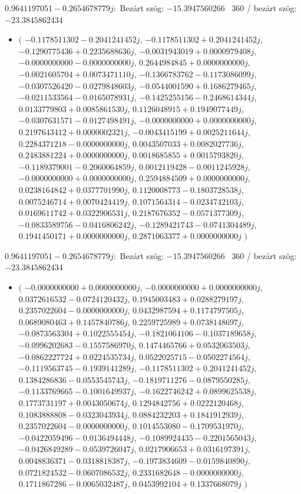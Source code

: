 \documentclass[14pt,a4paper]{article}
\begin{document}
$0.9641197051-0.2654678779j$:\
Bezárt szög: $-15.3947560266$ \
360 / bezárt szög: $-23.3845862434$\
\begin{itemize}
\item
$\big($
$-0.1178511302-0.2041241452j$, $-0.1178511302+0.2041241452j$, $-0.1290775436+0.2235688636j$, $-0.0031943019+0.0000979408j$, $-0.0000000000-0.0000000000j$, $0.2644984845+0.0000000000j$, $-0.0021605704+0.0073471110j$, $-0.1366783762-0.1173086099j$, $-0.0307526420-0.0279848603j$, $-0.0544001590+0.1686279465j$, $-0.0211533564-0.0165078931j$, $-0.1425255156-0.2468614344j$, $0.0133779803+0.0085861530j$, $0.1126048915+0.1949077449j$, $-0.0307631571-0.0127498491j$, $-0.0000000000+0.0000000000j$, $0.2197643412+0.0000002321j$, $-0.0043415199+0.0025211644j$, $0.2284371218-0.0000000000j$, $0.0043507033+0.0082027736j$, $0.2483881224+0.0000000000j$, $0.0018685855+0.0015793820j$, $-0.1189379001-0.2060064859j$, $0.0012119428-0.0011245928j$, $-0.0000000000+0.0000000000j$, $0.2594884509+0.0000000000j$, $0.0238164842+0.0377701990j$, $0.1120008773-0.1803728538j$, $0.0075246714+0.0070424419j$, $0.1071564314-0.0234742103j$, $0.0169611742+0.0322906531j$, $0.2187676352-0.0571377309j$, $-0.0833589756-0.0416806242j$, $-0.1289421743-0.0741304489j$, $0.1941450171+0.0000000000j$, $0.2871063377+0.0000000000j$
$\big)$
\end{itemize}
$0.9641197051-0.2654678779j$:\
Bezárt szög: $-15.3947560266$ \
360 / bezárt szög: $-23.3845862434$\
\begin{itemize}
\item
$\big($
$-0.0000000000+0.0000000000j$, $-0.0000000000+0.0000000000j$, $0.0372616532-0.0724120432j$, $0.1945003483+0.0288279197j$, $0.2357022604-0.0000000000j$, $0.0432987594+0.1174797505j$, $0.0689080463+0.1457840786j$, $0.2259725989+0.0738148697j$, $-0.0873563304+0.1022555454j$, $-0.1821064106-0.1037189658j$, $-0.0996202683-0.1557586970j$, $0.1474465766+0.0532063503j$, $-0.0862227724+0.0224535734j$, $0.0522025715-0.0502274564j$, $-0.1119563745-0.1939141289j$, $-0.1178511302+0.2041241452j$, $0.1384286836-0.0553545743j$, $-0.1819711276-0.0879550285j$, $-0.1133769665-0.1001649937j$, $-0.1622746242+0.0899625538j$, $0.1773731197+0.0043050674j$, $0.1294842756+0.0222120468j$, $0.1083888808-0.0323043934j$, $0.0884232203+0.1841912939j$, $0.2357022604-0.0000000000j$, $0.1014553080-0.1709531970j$, $-0.0422059496-0.0136494448j$, $-0.1089924435-0.2201565043j$, $-0.0426849289-0.0539726047j$, $0.0217906653+0.0316197391j$, $0.0048836371-0.0318818387j$, $-0.1973834609-0.0159840890j$, $0.0721824532-0.0607086532j$, $0.2331682648-0.0000000000j$, $0.1711867286-0.0065032487j$, $0.0453992104+0.1337668079j$
$\big)$
\end{itemize}
\end{document}
